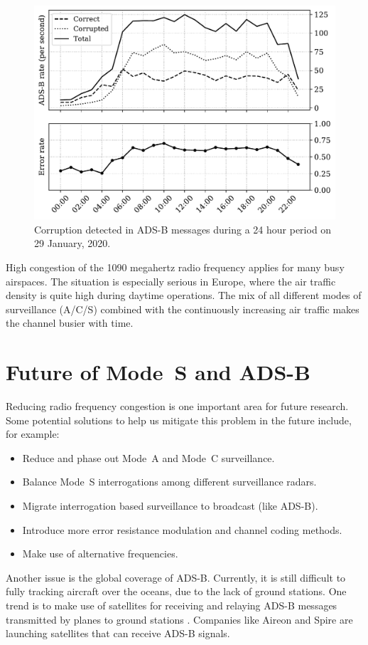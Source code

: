 \begin{figure}[ht]
    \centering
    \includegraphics[width=0.7\columnwidth]{figures/conclusion/adsb_corruption.pdf}
    \caption{Corruption detected in ADS-B messages during a 24 hour period on 29
    January, 2020.}
    \label{fig:adsb_corruption}
\end{figure}

High congestion of the 1090 megahertz radio frequency applies for many busy airspaces. The situation is especially serious in Europe, where the air traffic density is quite high during daytime operations. The mix of all different modes of surveillance (A/C/S) combined with the continuously increasing air traffic makes the channel busier with time.  

\section{Future of Mode~S and ADS-B}
Reducing radio frequency congestion is one important area for future research. Some potential solutions to help us mitigate this problem in the future include, for example:

\begin{itemize}
    \item Reduce and phase out Mode~A and Mode~C surveillance.
    \item Balance Mode~S interrogations among different surveillance radars.
    \item Migrate interrogation based surveillance to broadcast (like ADS-B).
    \item Introduce more error resistance modulation and channel coding methods.
    \item Make use of alternative frequencies.
\end{itemize}

Another issue is the global coverage of ADS-B. Currently, it is still difficult to fully tracking aircraft over the oceans, due to the lack of ground stations. One trend is to make use of satellites for receiving and relaying ADS-B messages transmitted by planes to ground stations \cite{noschese2011}. Companies like Aireon and Spire are launching satellites that can receive ADS-B signals. 

